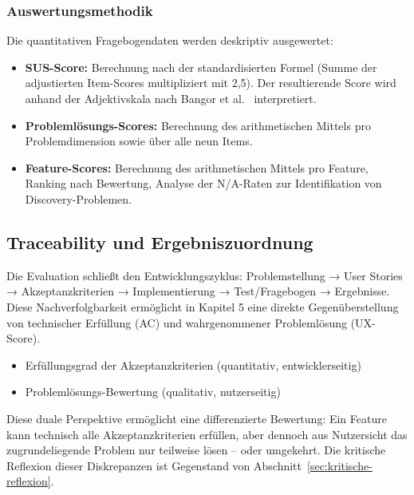 \subsubsection{Auswertungsmethodik}

Die quantitativen Fragebogendaten werden deskriptiv ausgewertet:

\begin{itemize}
    \item \textbf{SUS-Score:} Berechnung nach der standardisierten Formel (Summe der adjustierten Item-Scores multipliziert mit 2,5). Der resultierende Score wird anhand der Adjektivskala nach Bangor et al.~\cite{bangor2009determining} interpretiert.
    \item \textbf{Problemlösungs-Scores:} Berechnung des arithmetischen Mittels pro Problemdimension sowie über alle neun Items.
    \item \textbf{Feature-Scores:} Berechnung des arithmetischen Mittels pro Feature, Ranking nach Bewertung, Analyse der N/A-Raten zur Identifikation von Discovery-Problemen.
\end{itemize}

\subsection{Traceability und Ergebniszuordnung}
\label{sec:traceability-eval}

Die Evaluation schließt den Entwicklungszyklus: Problemstellung
→ User Stories → Akzeptanzkriterien → Implementierung → Test/Fragebogen
→ Ergebnisse. Diese Nachverfolgbarkeit ermöglicht in Kapitel 5 eine
direkte Gegenüberstellung von technischer Erfüllung (AC) und
wahrgenommener Problemlösung (UX-Score).

\begin{itemize}
    \item Erfüllungsgrad der Akzeptanzkriterien (quantitativ, entwicklerseitig)
    \item Problemlösungs-Bewertung (qualitativ, nutzerseitig)
\end{itemize}

Diese duale Perspektive ermöglicht eine differenzierte Bewertung: Ein Feature kann technisch alle Akzeptanzkriterien erfüllen, aber dennoch aus Nutzersicht das zugrundeliegende Problem nur teilweise lösen -- oder umgekehrt. Die kritische Reflexion dieser Diskrepanzen ist Gegenstand von Abschnitt~\ref{sec:kritische-reflexion}.

